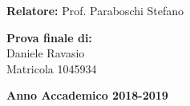 \begin{titlepage}
        \vspace{50mm}

        \noindent
        {\large \textbf{Relatore:} Prof. Paraboschi Stefano} \\


        \vspace{15mm}

        \begin{flushright}
            {\large \textbf{Prova finale di:}} \\
            \large{Daniele Ravasio} \\
            \large{Matricola 1045934}
        \end{flushright}
        \begin{center}
            {\large{\bf Anno Accademico 2018-2019}}
        \end{center}

        \restoregeometry

    \end{titlepage}